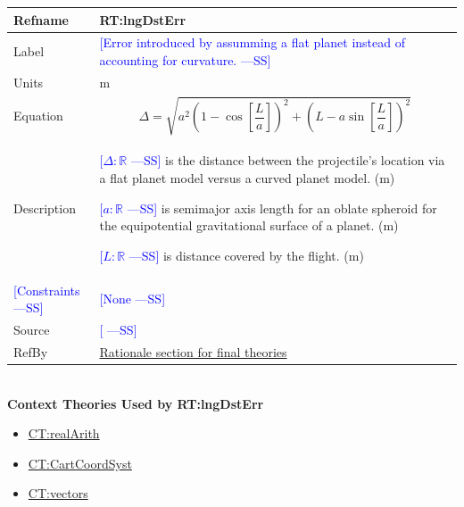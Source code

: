 \documentclass[12pt]{article}
\newcommand{\authornote}[3]{\textcolor{#1}{[#3 ---#2]}}
\newcommand{\authornote}[3]{}
\newcommand{\wss}[1]{\authornote{blue}{SS}{#1}}
\begin{document}
\noindent
\begin{minipage}{\textwidth}
\begin{tabular}{>{\raggedright}p{}>{\raggedright\arraybackslash}p{}}
\toprule \textbf{Refname} & \textbf{RT:lngDstErr}
\label{RT:lngDstErr}
\\ \midrule
Label & \wss{Error introduced by assumming a flat planet instead of accounting for curvature.}        
\\ \midrule
Units & $\text{m}$
        
\\ \midrule
Equation & \begin{displaymath}
           \Delta = \sqrt{a^2 \left( 1 - \cos \left[ \frac{L}{a} \right] \right)^2 + 
           \left( L - a \sin \left[ \frac{L}{a} \right] \right)^2}
           \end{displaymath}
\\ \midrule
Description & \begin{symbDescription}
              \item{\wss{$\Delta: \mathbb{R}$} is the distance between the projectile's location via a flat planet model versus a curved planet model. (${\text{m}}$)}
              \item{\wss{$a: \mathbb{R}$} is semimajor axis length for an oblate spheroid for the equipotential gravitational surface of a planet. (${\text{m}}$)}
              \item {\wss{$L: \mathbb{R}$} is distance covered by the flight. (${\text{m}}$)}
              \end{symbDescription}
\\ \midrule

\wss{Constraints} & \wss{None}
\\ \midrule

Source & \wss{\cite{Crouse2014}}
         
\\ \midrule
RefBy & \hyperref[Sec:FTRationale]{Rationale section for final theories}
\\ \bottomrule
\end{tabular}
\end{minipage}
~\\

\noindent \textbf{Context Theories Used by RT:lngDstErr}

\begin{itemize}
\item \hyperref[CT:realArith]{CT:realArith}
\item \hyperref[CT:CartCoordSyst]{CT:CartCoordSyst}
\item \hyperref[CT:vectors]{CT:vectors}
\end{itemize}
\end{document}
